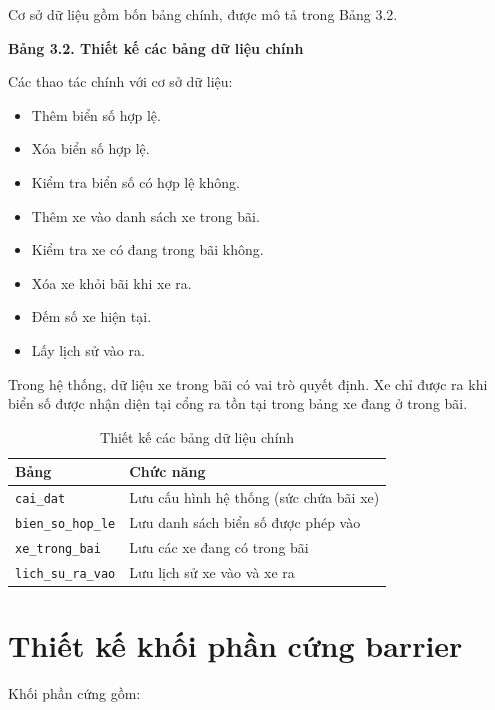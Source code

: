 \documentclass[a4paper,14pt]{extreport}
\begin{document}
Cơ sở dữ liệu gồm bốn bảng chính, được mô tả trong Bảng 3.2.

\textbf{Bảng 3.2. Thiết kế các bảng dữ liệu chính}

Các thao tác chính với cơ sở dữ liệu:

\begin{itemize}[leftmargin=2em]
  \item Thêm biển số hợp lệ.
  \item Xóa biển số hợp lệ.
  \item Kiểm tra biển số có hợp lệ không.
  \item Thêm xe vào danh sách xe trong bãi.
  \item Kiểm tra xe có đang trong bãi không.
  \item Xóa xe khỏi bãi khi xe ra.
  \item Đếm số xe hiện tại.
  \item Lấy lịch sử vào ra.
\end{itemize}
Trong hệ thống, dữ liệu xe trong bãi có vai trò quyết định. Xe chỉ được ra khi biển số được nhận diện tại cổng ra tồn tại trong bảng xe đang ở trong bãi.

\begin{table}[H]
\centering
\caption{Thiết kế các bảng dữ liệu chính}
\label{tab:bang_dl}
\begin{tabular}{ll}
\toprule
\textbf{Bảng} & \textbf{Chức năng} \\
\midrule
\texttt{cai\_dat} & Lưu cấu hình hệ thống (sức chứa bãi xe) \\
\texttt{bien\_so\_hop\_le} & Lưu danh sách biển số được phép vào \\
\texttt{xe\_trong\_bai} & Lưu các xe đang có trong bãi \\
\texttt{lich\_su\_ra\_vao} & Lưu lịch sử xe vào và xe ra \\
\bottomrule
\end{tabular}
\end{table}

\section{Thiết kế khối phần cứng barrier}

Khối phần cứng gồm:
\end{document}
